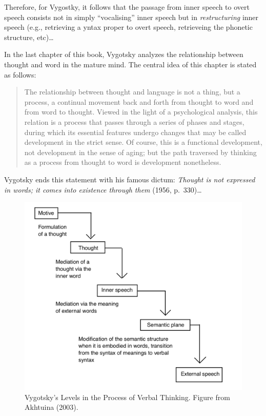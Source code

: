 \documentclass[a4paper,12pt,twoside,openright,oldfontcommands]{memoir}
\begin{document}
Therefore, for Vygostky, it follows that the passage from inner speech to overt speech consists not in simply \enquote{vocalising} inner speech but in \emph{restructuring} inner speech (e.g., retrieving a yntax proper to overt speech, retrieveing the phonetic structure, etc)\ldots{}

In the last chapter of this book, Vygotsky analyzes the relationship between thought and word in the mature mind. The central idea of this chapter is stated as follows:

\begin{quote}
The relationship between thought and language is not a thing, but a process, a continual movement back and forth from thought to word and from word to thought. Viewed in the light of a psychological analysis, this relation is a process that passes through a series of phases and stages, during which its essential features undergo changes that may be called development in the strict sense. Of course, this is a functional development, not development in the sense of aging; but the path traversed by thinking as a process from thought to word is development nonetheless.
\end{quote}

Vygotsky ends this statement with his famous dictum: \emph{Thought is not expressed in words; it comes into existence through them} (1956, p.~330)\ldots{}

\begin{figure}[H]

{\centering \includegraphics[width=0.75\linewidth]{assets/vygotsky} 

}

\caption{Vygotsky’s Levels in the Process of Verbal Thinking. Figure from Akhtuina (2003).}\label{fig:vygotsky}
\end{figure}
\end{document}
